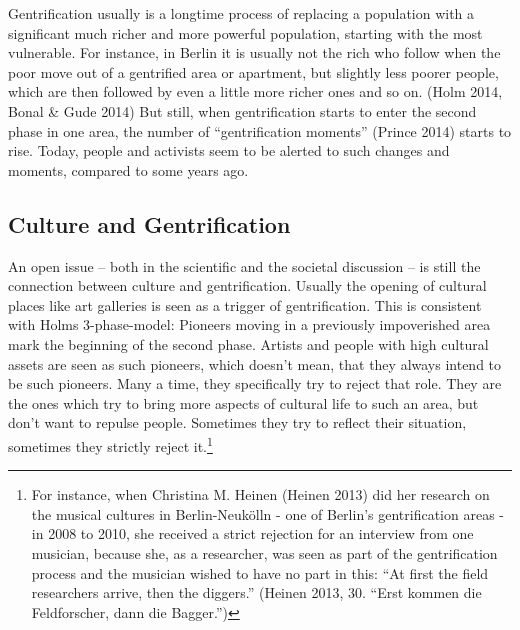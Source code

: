 \documentclass[a4paper,
fontsize=11pt,
oneside,
numbers=noperiodatend,
parskip=half-,
bibliography=totoc,
final
]{scrartcl}
\begin{document}
Gentrification usually is a longtime process of replacing a population
with a significant much richer and more powerful population, starting
with the most vulnerable. For instance, in Berlin it is usually not the
rich who follow when the poor move out of a gentrified area or
apartment, but slightly less poorer people, which are then followed by
even a little more richer ones and so on. (Holm 2014, Bonal \& Gude
2014) But still, when gentrification starts to enter the second phase in
one area, the number of \enquote{gentrification moments} (Prince 2014)
starts to rise. Today, people and activists seem to be alerted to such
changes and moments, compared to some years ago.

\subsection{Culture and Gentrification}\label{culture-and-gentrification}

An open issue -- both in the scientific and the societal discussion --
is still the connection between culture and gentrification. Usually the
opening of cultural places like art galleries is seen as a trigger of
gentrification. This is consistent with Holms 3-phase-model: Pioneers
moving in a previously impoverished area mark the beginning of the
second phase. Artists and people with high cultural assets are seen as
such pioneers, which doesn't mean, that they always intend to be such
pioneers. Many a time, they specifically try to reject that role. They
are the ones which try to bring more aspects of cultural life to such an
area, but don't want to repulse people. Sometimes they try to reflect
their situation, sometimes they strictly reject it.\footnote{For
  instance, when Christina M. Heinen (Heinen 2013) did her research on
  the musical cultures in Berlin-Neukölln - one of Berlin's
  gentrification areas - in 2008 to 2010, she received a strict
  rejection for an interview from one musician, because she, as a
  researcher, was seen as part of the gentrification process and the
  musician wished to have no part in this: \enquote{At first the field
  researchers arrive, then the diggers.} (Heinen 2013, 30. \enquote{Erst
  kommen die Feldforscher, dann die Bagger.})}
\end{document}
